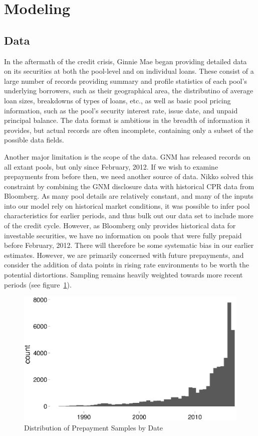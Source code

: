 \documentclass{article}
\begin{document}
\section{Modeling}
\subsection{Data}
In the aftermath of the credit crisis, Ginnie Mae began providing detailed data on its securities at both the pool-level and on individual loans. These consist of a large number of records providing summary and profile statistics of each pool's underlying borrowers, such as their geographical area, the distributino of average loan sizes, breakdowns of types of loans, etc., as well as basic pool pricing information, such as the pool's security interest rate, issue date, and unpaid principal balance. The data format is ambitious in the breadth of information it provides, but actual records are often incomplete, containing only a subset of the possible data fields. 

Another major limitation is the scope of the data. GNM has released records on all extant pools, but only since February, 2012. If we wish to examine prepayments from before then, we need another source of data. Nikko solved this constraint by combining the GNM disclosure data with historical CPR data from Bloomberg. As many pool details are relatively constant, and many of the inputs into our model rely on historical market conditions, it was possible to infer pool characteristics for earlier periods, and thus bulk out our data set to include more of the credit cycle. However, as Bloomberg only provides historical data for investable securities, we have no information on pools that were fully prepaid before February, 2012. There will therefore be some systematic bias in our earlier estimates. However, we are primarily concerned with future prepayments, and consider the addition of data points in rising rate environments to be worth the potential distortions. Sampling remains heavily weighted towards more recent periods (see figure~\ref{fig:date_hist}).
\begin{figure}
	\centering
	\includegraphics[scale=0.5]{white_paper_files/date_hist}
	\caption{Distribution of Prepayment Samples by Date}
	\label{fig:date_hist}
\end{figure}
\end{document}
